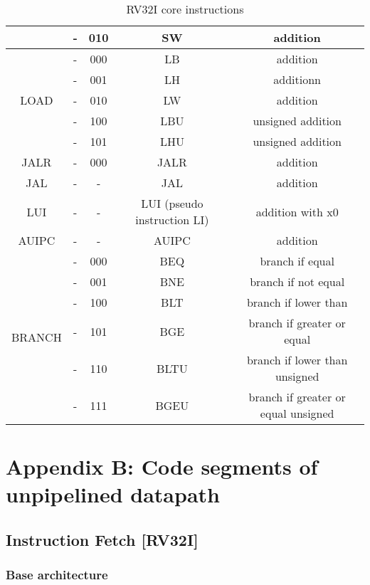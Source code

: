 \begin{table}[ht]
\begin{center}
\begin{tabular}{|c|c|c|c|c|}
            & - & 010 & SW & addition\\
            \hline
            \multirow{5}{*}{LOAD} & - & 000 & LB & addition\\
            & - & 001 & LH & additionn\\
            & - & 010 & LW & addition\\
            & - & 100 & LBU & unsigned addition\\
            & - & 101 & LHU & unsigned addition\\
            \hline
            JALR & - & 000 & JALR & addition\\
            \hline
            JAL & - & - & JAL & addition\\
            \hline
            LUI & - & - & LUI (pseudo instruction LI) & addition with x0\\
            \hline
            AUIPC & - & - & AUIPC & addition\\
            \hline
            \multirow{6}{*}{BRANCH} & - & 000 & BEQ & branch if equal\\
            & - & 001 & BNE & branch if not equal\\
            & - & 100 & BLT & branch if lower than\\
            & - & 101 & BGE & branch if greater or equal\\
            & - & 110 & BLTU & branch if lower than unsigned\\
            & - & 111 & BGEU & branch if greater or equal unsigned\\
            \hline
        \end{tabular}
        \caption{RV32I core instructions}
        \label{table:core_instr}
    \end{center}
\end{table}

\section{Appendix B: Code segments of unpipelined datapath}

\subsection{Instruction Fetch [RV32I]}

\subsubsection{Base architecture}
\begin{code}
\label{code:IF_code}   
\inputminted[fontsize=\footnotesize]{vhdl}{\srcfolder instr_fetch.vhd}
\end{code}
\newpage



